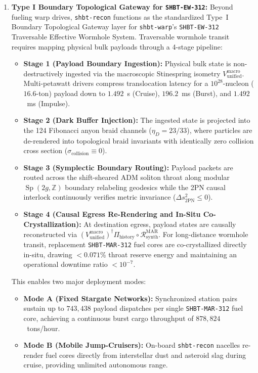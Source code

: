 \documentclass[11pt,onecolumn]{article}
\begin{document}
\begin{enumerate}
    \item \textbf{Type I Boundary Topological Gateway for \texttt{SHBT-EW-312}:}
    Beyond fueling warp drives, \texttt{shbt-recon} functions as the standardized Type~I Boundary Topological Gateway layer for \texttt{shbt-warp}'s \texttt{SHBT-EW-312} Traversable Effective Wormhole System. Traversable wormhole transit requires mapping physical bulk payloads through a 4-stage pipeline:
    \begin{itemize}
        \item \textbf{Stage 1 (Payload Boundary Ingestion):} Physical bulk state is non-destructively ingested via the macroscopic Stinespring isometry $V_{\text{unified}}^{\text{macro}}$. Multi-petawatt drivers compress translocation latency for a $10^{28}$-nucleon ($16.6$-ton) payload down to $1.492$~s (Cruise), $196.2$~ms (Burst), and $1.492$~ms (Impulse).
        \item \textbf{Stage 2 (Dark Buffer Injection):} The ingested state is projected into the 124 Fibonacci anyon braid channels ($\eta_D = 23/33$), where particles are de-rendered into topological braid invariants with identically zero collision cross section ($\sigma_{\text{collision}} \equiv 0$).
        \item \textbf{Stage 3 (Symplectic Boundary Routing):} Payload packets are routed across the shift-sheared ADM soliton throat along modular $\operatorname{Sp}(2g, \mathbb{Z})$ boundary relabeling geodesics while the 2PN causal interlock continuously verifies metric invariance ($\Delta s^2_{\text{2PN}} \le 0$).
        \item \textbf{Stage 4 (Causal Egress Re-Rendering and In-Situ Co-Crystallization):} At destination egress, payload states are causally reconstructed via $(V_{\text{unified}}^{\text{macro}})^\dagger \Pi_{\text{history}} \circ \mathcal{R}_{\text{synth}}^{\text{MAR}}$. For long-distance wormhole transit, replacement \texttt{SHBT-MAR-312} fuel cores are co-crystallized directly in-situ, drawing $<0.071\%$ throat reserve energy and maintaining an operational downtime ratio $<10^{-7}$.
    \end{itemize}
    This enables two major deployment modes:
    \begin{itemize}
        \item \textbf{Mode A (Fixed Stargate Networks):} Synchronized station pairs sustain up to $743{,}438$ payload dispatches per single \texttt{SHBT-MAR-312} fuel core, achieving a continuous burst cargo throughput of $878{,}824$~tons/hour.
        \item \textbf{Mode B (Mobile Jump-Cruisers):} On-board \texttt{shbt-recon} nacelles re-render fuel cores directly from interstellar dust and asteroid slag during cruise, providing unlimited autonomous range.
    \end{itemize}
\end{enumerate}
\end{document}

